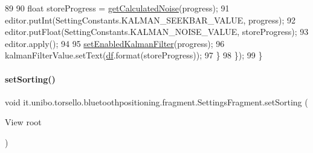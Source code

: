 \begin{DoxyCode}
89 
90                 \textcolor{keywordtype}{float} storeProgress = \hyperlink{classit_1_1unibo_1_1torsello_1_1bluetoothpositioning_1_1fragment_1_1SettingsFragment_a595d859602f34ca81957a0578c1602a6_a595d859602f34ca81957a0578c1602a6}{getCalculatedNoise}(progress);
91                 editor.putInt(SettingConstants.KALMAN\_SEEKBAR\_VALUE, progress);
92                 editor.putFloat(SettingConstants.KALMAN\_NOISE\_VALUE, storeProgress);
93                 editor.apply();
94 
95                 \hyperlink{classit_1_1unibo_1_1torsello_1_1bluetoothpositioning_1_1fragment_1_1SettingsFragment_ae16c093ba7bc137acf21dfc221cdcf56_ae16c093ba7bc137acf21dfc221cdcf56}{setEnabledKalmanFilter}(progress);
96                 kalmanFilterValue.setText(\hyperlink{classit_1_1unibo_1_1torsello_1_1bluetoothpositioning_1_1fragment_1_1SettingsFragment_af6b80a700dc80c39a56d001b68a47694_af6b80a700dc80c39a56d001b68a47694}{df}.format(storeProgress));
97             \}
98         \});
99     \}
\end{DoxyCode}
\hypertarget{classit_1_1unibo_1_1torsello_1_1bluetoothpositioning_1_1fragment_1_1SettingsFragment_ae29f0b3d6fc60f1ceeab5dcc530166c1_ae29f0b3d6fc60f1ceeab5dcc530166c1}{}\label{classit_1_1unibo_1_1torsello_1_1bluetoothpositioning_1_1fragment_1_1SettingsFragment_ae29f0b3d6fc60f1ceeab5dcc530166c1_ae29f0b3d6fc60f1ceeab5dcc530166c1} 
\paragraph{\texorpdfstring{set\+Sorting()}{setSorting()}}
{\footnotesize\ttfamily void it.\+unibo.\+torsello.\+bluetoothpositioning.\+fragment.\+Settings\+Fragment.\+set\+Sorting (\begin{DoxyParamCaption}\item[{View}]{root }\end{DoxyParamCaption})\hspace{0.3cm}{\ttfamily [private]}}


